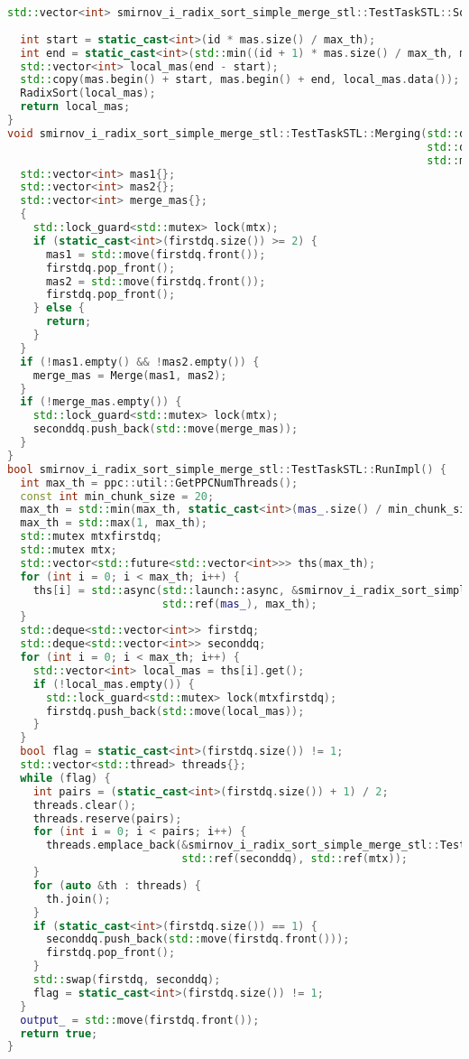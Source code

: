 \documentclass[a4paper,12pt]{article}
\begin{document}
\begin{lstlisting}[language=C++,caption={Фрагмент STL версии}]
std::vector<int> smirnov_i_radix_sort_simple_merge_stl::TestTaskSTL::Sorting(int id, std::vector<int> &mas,
                                                                             int max_th) {
  int start = static_cast<int>(id * mas.size() / max_th);
  int end = static_cast<int>(std::min((id + 1) * mas.size() / max_th, mas.size()));
  std::vector<int> local_mas(end - start);
  std::copy(mas.begin() + start, mas.begin() + end, local_mas.data());
  RadixSort(local_mas);
  return local_mas;
}
void smirnov_i_radix_sort_simple_merge_stl::TestTaskSTL::Merging(std::deque<std::vector<int>> &firstdq,
                                                                 std::deque<std::vector<int>> &seconddq,
                                                                 std::mutex &mtx) {
  std::vector<int> mas1{};
  std::vector<int> mas2{};
  std::vector<int> merge_mas{};
  {
    std::lock_guard<std::mutex> lock(mtx);
    if (static_cast<int>(firstdq.size()) >= 2) {
      mas1 = std::move(firstdq.front());
      firstdq.pop_front();
      mas2 = std::move(firstdq.front());
      firstdq.pop_front();
    } else {
      return;
    }
  }
  if (!mas1.empty() && !mas2.empty()) {
    merge_mas = Merge(mas1, mas2);
  }
  if (!merge_mas.empty()) {
    std::lock_guard<std::mutex> lock(mtx);
    seconddq.push_back(std::move(merge_mas));
  }
}
bool smirnov_i_radix_sort_simple_merge_stl::TestTaskSTL::RunImpl() {
  int max_th = ppc::util::GetPPCNumThreads();
  const int min_chunk_size = 20;
  max_th = std::min(max_th, static_cast<int>(mas_.size() / min_chunk_size) + 1);
  max_th = std::max(1, max_th);
  std::mutex mtxfirstdq;
  std::mutex mtx;
  std::vector<std::future<std::vector<int>>> ths(max_th);
  for (int i = 0; i < max_th; i++) {
    ths[i] = std::async(std::launch::async, &smirnov_i_radix_sort_simple_merge_stl::TestTaskSTL::Sorting, i,
                        std::ref(mas_), max_th);
  }
  std::deque<std::vector<int>> firstdq;
  std::deque<std::vector<int>> seconddq;
  for (int i = 0; i < max_th; i++) {
    std::vector<int> local_mas = ths[i].get();
    if (!local_mas.empty()) {
      std::lock_guard<std::mutex> lock(mtxfirstdq);
      firstdq.push_back(std::move(local_mas));
    }
  }
  bool flag = static_cast<int>(firstdq.size()) != 1;
  std::vector<std::thread> threads{};
  while (flag) {
    int pairs = (static_cast<int>(firstdq.size()) + 1) / 2;
    threads.clear();
    threads.reserve(pairs);
    for (int i = 0; i < pairs; i++) {
      threads.emplace_back(&smirnov_i_radix_sort_simple_merge_stl::TestTaskSTL::Merging, std::ref(firstdq),
                           std::ref(seconddq), std::ref(mtx));
    }
    for (auto &th : threads) {
      th.join();
    }
    if (static_cast<int>(firstdq.size()) == 1) {
      seconddq.push_back(std::move(firstdq.front()));
      firstdq.pop_front();
    }
    std::swap(firstdq, seconddq);
    flag = static_cast<int>(firstdq.size()) != 1;
  }
  output_ = std::move(firstdq.front());
  return true;
}
\end{lstlisting}
\end{document}
